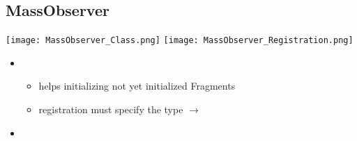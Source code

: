         \subsection{MassObserver}
            \texttt{[image: MassObserver\_Class.png]}
            \texttt{[image: MassObserver\_Registration.png]}
            
            \begin{itemize}
                \item {}
                \begin{itemize}
                    \item helps initializing not yet initialized Fragments
                    \item registration must specify the type $\rightarrow$ 
                \end{itemize}
                \item 
            \end{itemize}

    